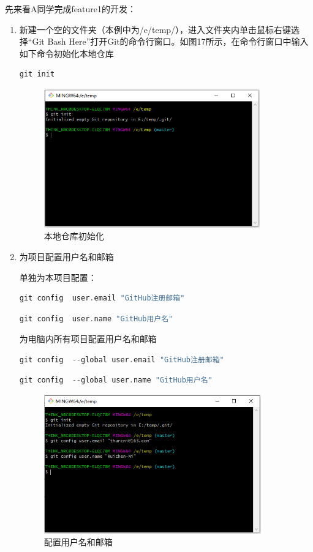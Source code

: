 \documentclass[a4paper,14pt]{article}
\begin{document}
先来看A同学完成feature1的开发：
\begin{enumerate}[1. ]
\item 新建一个空的文件夹（本例中为/e/temp/），进入文件夹内单击鼠标右键选择“Git Bash Here”打开Git的命令行窗口。如图17所示，在命令行窗口中输入如下命令初始化本地仓库

{\color{red}
\begin{lstlisting}[language=C]
git init
\end{lstlisting}
}
\begin{figure}[h]
\centering
\includegraphics[height=6cm]{figure/step1}
\caption{本地仓库初始化}
\end{figure}
\item 为项目配置用户名和邮箱

单独为本项目配置：

{\color{red}
\begin{lstlisting}[language=C]
git config  user.email "GitHub注册邮箱"
\end{lstlisting}
}

{\color{red}
\begin{lstlisting}[language=C]
git config  user.name "GitHub用户名"
\end{lstlisting}
}

为电脑内所有项目配置用户名和邮箱

{\color{red}
\begin{lstlisting}[language=C]
git config  --global user.email "GitHub注册邮箱"
\end{lstlisting}
}

{\color{red}
\begin{lstlisting}[language=C]
git config  --global user.name "GitHub用户名"
\end{lstlisting}
}
\begin{figure}[h]
\centering
\includegraphics[height=6cm]{figure/step2}
\caption{配置用户名和邮箱}
\end{figure}


\end{enumerate}
\end{document}
